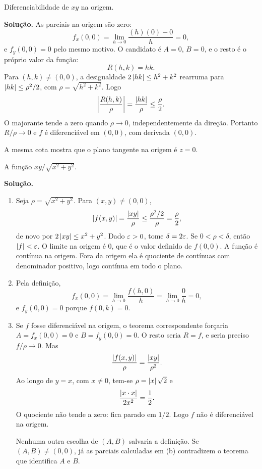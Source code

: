 \documentclass[11pt,a4paper]{article}
\begin{document}
\begin{exercicio}
Diferenciabilidade de $xy$ na origem.

\textbf{Solução.}
As parciais na origem são zero:
\[
f_x(0,0)=\lim_{h\to 0}\frac{(h)(0)-0}{h}=0,
\]
e $f_y(0,0)=0$ pelo mesmo motivo. O candidato é $A=0$, $B=0$, e o resto é o próprio valor da função:
\[
R(h,k)=hk.
\]
Para $(h,k)\neq(0,0)$, a desigualdade $2\left\lvert hk \right\rvert\le h^2+k^2$ rearruma para $\left\lvert hk \right\rvert\le\rho^2/2$, com $\rho=\sqrt{h^2+k^2}$. Logo
\[
\left\lvert \frac{R(h,k)}{\rho} \right\rvert=\frac{\left\lvert hk \right\rvert}{\rho}\le\frac{\rho}{2}.
\]
O majorante tende a zero quando $\rho\to 0$, independentemente da direção. Portanto $R/\rho\to 0$ e $f$ é diferenciável em $(0,0)$, com derivada $(0,0)$.

A mesma cota mostra que o plano tangente na origem é $z=0$.
\end{exercicio}

\begin{exercicio}
A função $xy/\sqrt{x^2+y^2}$.

\textbf{Solução.}
\begin{enumerate}[label=\alph*)]
\item Seja $\rho=\sqrt{x^2+y^2}$. Para $(x,y)\neq(0,0)$,
\[
\left\lvert f(x,y) \right\rvert=\frac{\left\lvert xy \right\rvert}{\rho}\le\frac{\rho^2/2}{\rho}=\frac{\rho}{2},
\]
de novo por $2\left\lvert xy \right\rvert\le x^2+y^2$. Dado $\varepsilon>0$, tome $\delta=2\varepsilon$. Se $0<\rho<\delta$, então $\left\lvert f \right\rvert<\varepsilon$. O limite na origem é $0$, que é o valor definido de $f(0,0)$. A função é contínua na origem. Fora da origem ela é quociente de contínuas com denominador positivo, logo contínua em todo o plano.

\item Pela definição,
\[
f_x(0,0)=\lim_{h\to 0}\frac{f(h,0)}{h}=\lim_{h\to 0}\frac{0}{h}=0,
\]
e $f_y(0,0)=0$ porque $f(0,k)=0$.

\item Se $f$ fosse diferenciável na origem, o teorema correspondente forçaria $A=f_x(0,0)=0$ e $B=f_y(0,0)=0$. O resto seria $R=f$, e seria preciso $f/\rho\to 0$. Mas
\[
\frac{\left\lvert f(x,y) \right\rvert}{\rho}=\frac{\left\lvert xy \right\rvert}{\rho^2}.
\]
Ao longo de $y=x$, com $x\neq 0$, tem-se $\rho=\left\lvert x \right\rvert\sqrt{2}$ e
\[
\frac{\left\lvert x\cdot x \right\rvert}{2x^2}=\frac{1}{2}.
\]
O quociente não tende a zero: fica parado em $1/2$. Logo $f$ não é diferenciável na origem.

Nenhuma outra escolha de $(A,B)$ salvaria a definição. Se $(A,B)\neq(0,0)$, já as parciais calculadas em (b) contradizem o teorema que identifica $A$ e $B$.
\end{enumerate}
\end{exercicio}
\end{document}
